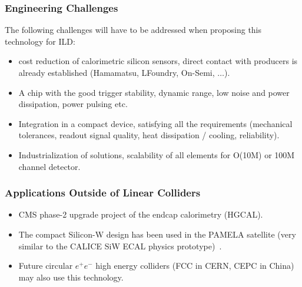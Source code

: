 \documentclass{article}
\begin{document}
\subsubsection{Engineering Challenges}

The following challenges will have to be addressed when proposing this
technology for ILD:
\begin{itemize}
\item cost reduction of calorimetric silicon sensors, direct contact
  with producers is already established (Hamamatsu, LFoundry, On-Semi, $\ldots$).
\item A chip with the good trigger stability, dynamic range, low noise and
  power dissipation, power pulsing etc.
\item Integration in a compact device, satisfying all the requirements
  (mechanical tolerances, readout signal quality, heat dissipation / cooling,
  reliability).
\item Industrialization of solutions, scalability of all elements for O(10M)
  or 100M channel detector.
\end{itemize}


\subsubsection{Applications Outside of Linear Colliders}
\begin{itemize}
\item CMS phase-2 upgrade project of the
  endcap calorimetry (HGCAL).
\item The compact Silicon-W design has been used in the PAMELA satellite (very
  similar to the CALICE SiW ECAL physics prototype)~\cite{pamela}.
\item Future circular $e^+e^-$ high energy colliders (FCC in CERN, CEPC in China) 
may also use this technology.
\end{itemize}
\end{document}
